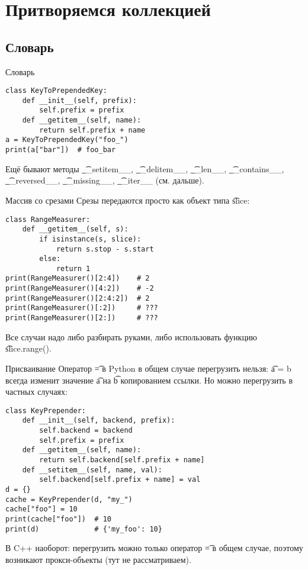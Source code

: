 \section{Притворяемся коллекцией}
\subsection{Словарь}
\begin{frame}
\end{frame}

\begin{frame}[fragile]{Словарь}
\begin{verbatim}
class KeyToPrependedKey:
    def __init__(self, prefix):
        self.prefix = prefix
    def __getitem__(self, name):
        return self.prefix + name
a = KeyToPrependedKey("foo_")
print(a["bar"])  # foo_bar
\end{verbatim}
	Ещё бывают методы \t{\_\_setitem\_\_}, \t{\_\_delitem\_\_}, \t{\_\_len\_\_}, \t{\_\_contains\_\_}, \t{\_\_reversed\_\_}, \t{\_\_missing\_\_}, \t{\_\_iter\_\_} (см. дальше).
\end{frame}

\begin{frame}[fragile]{Массив со срезами}
	Срезы передаются просто как объект типа \t{slice}:
\begin{verbatim}
class RangeMeasurer:
    def __getitem__(self, s):
        if isinstance(s, slice):
            return s.stop - s.start
        else:
            return 1
print(RangeMeasurer()[2:4])    # 2
print(RangeMeasurer()[4:2])    # -2
print(RangeMeasurer()[2:4:2])  # 2
print(RangeMeasurer()[:2])     # ???
print(RangeMeasurer()[2:])     # ???
\end{verbatim}
	\pause
	Все случаи надо либо разбирать руками, либо использовать функцию \t{slice.range()}.
\end{frame}

\begin{frame}[fragile]{Присваивание}
	Оператор \t{=} в Python в общем случае перегрузить нельзя: \t{a = b}
	всегда изменит значение \t{a} на \t{b} копированием ссылки.
	Но можно перегрузить в частных случаях:
\begin{verbatim}
class KeyPrepender:
    def __init__(self, backend, prefix):
        self.backend = backend
        self.prefix = prefix
    def __getitem__(self, name):
        return self.backend[self.prefix + name]
    def __setitem__(self, name, val):
        self.backend[self.prefix + name] = val
d = {}
cache = KeyPrepender(d, "my_")
cache["foo"] = 10
print(cache["foo"])  # 10
print(d)             # {'my_foo': 10}
\end{verbatim}

	В C++ наоборот: перегрузить можно только оператор \t{=} в общем случае,
	поэтому возникают прокси-объекты (тут не рассматриваем).
\end{frame}
